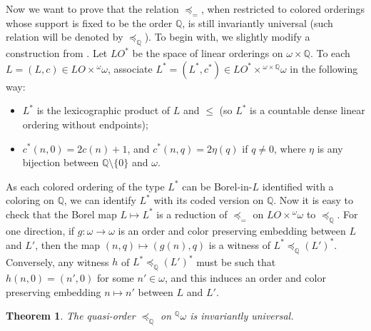 \documentclass{amsart}
\newtheorem{theorem}{Theorem}[section]
\theoremstyle{definition}
\theoremstyle{remark}
\begin{document}
Now we want to prove that the relation $\preceq_=$, when restricted to
colored orderings whose support is fixed to
be the order ${\mathbb{Q}}$, is still
invariantly universal (such relation will be denoted by $\preceq_{\mathbb{Q}}$). To begin with, we slightly modify a
construction from \cite[Lemma 3]{Camerlo}. Let $LO^*$ be the space of linear
orderings on $\omega \times {\mathbb{Q}}$. To each $L = (L,c) \in LO \times
{}^\omega \omega$, associate $L^* = (L^*,c^*) \in LO^* \times
{}^{\omega \times {\mathbb{Q}}} \omega$ in the following way:
\begin{itemize}
\item $L^*$ is the lexicographic product of $L$ and $\leq $ (so $L^*$ is a countable dense linear ordering without
endpoints);
\item $c^*(n,0) = 2c(n)+1$, and $c^*(n,q)
= 2 \eta(q)$ if $q \neq 0$, where $\eta$ is any bijection between ${\mathbb{Q}}
\setminus \{ 0 \}$ and $\omega$.
\end{itemize}
As each colored ordering of the type
$L^*$ can
be Borel-in-$L$ identified with a coloring on
${\mathbb{Q}}$, we can identify $L^*$ with its coded version on ${\mathbb{Q}}$. Now it
is easy to check that
the Borel map $L \mapsto L^*$ is a reduction of $\preceq_=$ on $LO
\times {}^\omega \omega$ to $\preceq_{\mathbb{Q}}$. For one direction, if $g
\colon \omega \to \omega$ is an order and color preserving embedding
between $L$ and $L'$, then the map $(n,q) \mapsto (g(n),q)$ is a
witness of $L^* \preceq_{\mathbb{Q}} (L')^*$. Conversely, any witness $h$ of $L^*
\preceq_{\mathbb{Q}}(L')^*$ must be such that $h(n,0) = (n',0)$ for some $n' \in
\omega$, and this induces an order and color preserving embedding $n\mapsto n'$
between $L$ and $L'$.

\begin{theorem}\label{theorQuniversal}
The quasi-order $\preceq_{\mathbb{Q}}$ on ${}^{\mathbb{Q}} \omega$ is invariantly universal.
\end{theorem}
\end{document}
